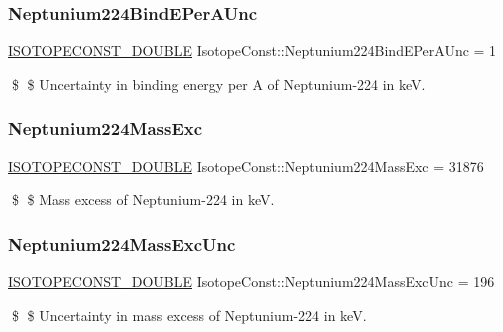 \subsubsection{\texorpdfstring{Neptunium224\+Bind\+E\+Per\+A\+Unc}{Neptunium224BindEPerAUnc}}
{\footnotesize\ttfamily \mbox{\hyperlink{group___isotope_const-_macros_ga8f45a7272ce02c0b4c65c44636ed719a}{I\+S\+O\+T\+O\+P\+E\+C\+O\+N\+S\+T\+\_\+\+D\+O\+U\+B\+LE}} Isotope\+Const\+::\+Neptunium224\+Bind\+E\+Per\+A\+Unc = 1}

\$ \$ Uncertainty in binding energy per A of Neptunium-\/224 in keV. \mbox{\label{group___isotope_const-_neptunium-_np224_gadfe49e6f7a22d33216f84a0d5ff3ea3c}} 
\subsubsection{\texorpdfstring{Neptunium224\+Mass\+Exc}{Neptunium224MassExc}}
{\footnotesize\ttfamily \mbox{\hyperlink{group___isotope_const-_macros_ga8f45a7272ce02c0b4c65c44636ed719a}{I\+S\+O\+T\+O\+P\+E\+C\+O\+N\+S\+T\+\_\+\+D\+O\+U\+B\+LE}} Isotope\+Const\+::\+Neptunium224\+Mass\+Exc = 31876}

\$ \$ Mass excess of Neptunium-\/224 in keV. \mbox{\label{group___isotope_const-_neptunium-_np224_ga05eddd5f587925b4b1fe70cb69f63556}} 
\subsubsection{\texorpdfstring{Neptunium224\+Mass\+Exc\+Unc}{Neptunium224MassExcUnc}}
{\footnotesize\ttfamily \mbox{\hyperlink{group___isotope_const-_macros_ga8f45a7272ce02c0b4c65c44636ed719a}{I\+S\+O\+T\+O\+P\+E\+C\+O\+N\+S\+T\+\_\+\+D\+O\+U\+B\+LE}} Isotope\+Const\+::\+Neptunium224\+Mass\+Exc\+Unc = 196}

\$ \$ Uncertainty in mass excess of Neptunium-\/224 in keV. \mbox{\label{group___isotope_const-_neptunium-_np224_ga792f26feadff78496d7cb641c56fb483}} 

